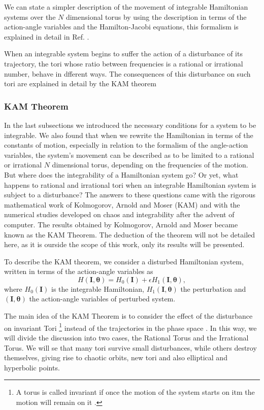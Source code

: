 We can state a simpler description of the movement of integrable Hamiltonian systems over the $N$ dimensional torus by using the description in terms of the action-angle variables and the Hamilton-Jacobi equations, this formalism is explained in detail in Ref. \cite{goldstein2002classical}. 

When an integrable system begins to suffer the action of a disturbance of its trajectory, the tori whose ratio between frequencies is a rational or irrational number, behave in dfferent ways. The consequences of this disturbance on such tori are explained in detail by the KAM theorem


\subsubsection{KAM Theorem}
In the last subsections we introduced the necessary conditions for a system to be integrable. We also found that when we rewrite the Hamiltonian in terms of the constants of motion, especially in relation to the formalism of the angle-action variables, the system's movement can be described as to be limited to a rational or irrational $N$ dimensional torus, depending on the frequencies of the motion. But where does the integrability of a Hamiltonian system go? Or yet, what happens to rational and irrational tori when an integrable Hamiltonian system is subject to a disturbance? The answers to these questions came with the rigorous mathematical work of Kolmogorov, Arnold and Moser (KAM) and with the numerical studies developed on chaos and integrability after the advent of computer. The results obtained by Kolmogorov, Arnold and Moser became known as the KAM Theorem. The deduction of the theorem will not be detailed here, as it is ourside the scope of this work, only its results will be presented.\par

To describe the KAM theorem, we consider a disturbed Hamiltonian system, written in terms of the action-angle variables as
\begin{equation}
H(\bm{I},\bm{\theta})=H_0(\bm{I})+\epsilon H_1(\bm{I},\bm{\theta}),
\end{equation}
where $H_0(\bm{I})$ is the integrable Hamiltonian, $H_1(\bm{I},\bm{\theta})$ the perturbation and $(\bm{I},\bm{\theta})$ the action-angle variables of perturbed system.\par

The main idea of the KAM Theorem is to consider the effect of the disturbance on invariant Tori \footnote{A torus is called invariant if once the motion of the system starts on itm the motion will remain on it \cite{ott_chaos_2002}.} instead of the trajectories in the phase space \cite{zaslavsky2005hamiltonian}. In this way, we will divide the discussion into two cases, the Rational Torus and the Irrational Torus. We will se that many tori survive small disturbances, while others destroy themselves, giving rise to chaotic orbits, new tori and also elliptical and hyperbolic points.



